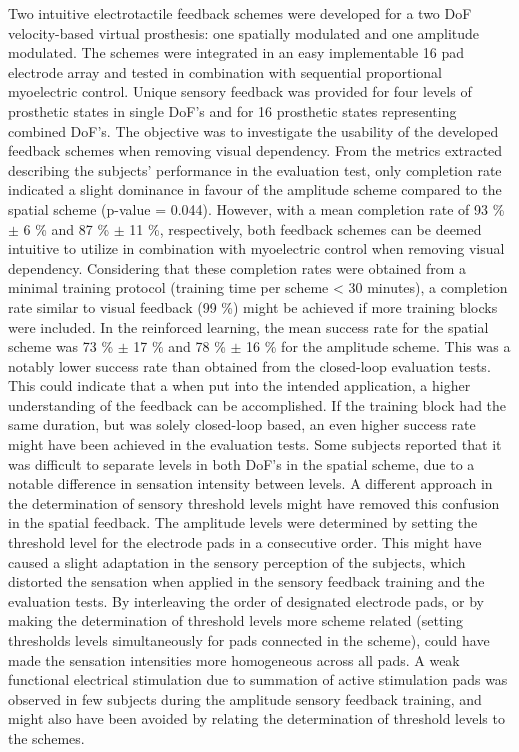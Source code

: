 Two intuitive electrotactile feedback schemes were developed for a two DoF velocity-based virtual prosthesis: one spatially modulated and one amplitude modulated. The schemes were integrated in an easy implementable 16 pad electrode array and tested in combination with sequential proportional myoelectric control. Unique sensory feedback was provided for four levels of prosthetic states in single DoF's and for 16 prosthetic states representing combined DoF's. The objective was to investigate the usability of the developed feedback schemes when removing visual dependency.
From the metrics extracted describing the subjects' performance in the evaluation test, only completion rate indicated a slight  dominance in favour of the amplitude scheme compared to the spatial scheme (p-value = 0.044). However, with a mean completion rate of 93 \% $\pm$ 6 \% and 87 \% $\pm$ 11 \%, respectively, both feedback schemes can be deemed intuitive to utilize in combination with myoelectric control when removing visual dependency. Considering that these completion rates were obtained from a minimal training protocol (training time per scheme < 30 minutes), a completion rate similar to visual feedback (99 \%) might be achieved if more training blocks were included.
In the reinforced learning, the mean success rate for the spatial scheme was 73 \%  $\pm$ 17 \% and 78 \%  $\pm$ 16 \% for the amplitude scheme. This was a notably lower success rate than obtained from the closed-loop evaluation tests. This could indicate that a when put into the intended application, a higher understanding of the feedback can be accomplished. If the training block had the same duration, but was solely closed-loop based, an even higher success rate might have been achieved in the evaluation tests. 
Some subjects reported that it was difficult to separate levels in both DoF's in the spatial scheme, due to a notable difference in sensation intensity between levels. A different approach in the determination of sensory threshold levels might have removed this confusion in the spatial feedback. The amplitude levels were determined by setting the threshold level for the electrode pads in a consecutive order. This might have caused a slight adaptation in the sensory perception of the subjects, which distorted the sensation when applied in the sensory feedback training and the evaluation tests. By interleaving the order of designated electrode pads, or by making the determination of threshold levels more scheme related (setting thresholds levels simultaneously for pads connected in the scheme), could have made the sensation intensities more homogeneous across all pads. A weak functional electrical stimulation due to summation of active stimulation pads was observed in few subjects during the amplitude sensory feedback training, and might also have been avoided by relating the determination of threshold levels to the schemes. 
